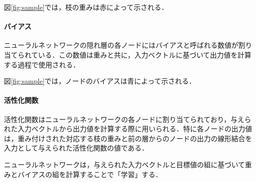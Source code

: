 \documentclass[11pt,dvipdfmx,twoside]{jarticle}
\newcommand{\figref}[1]{図\ref{fig:#1}}
\begin{document}
\figref{sample}では，枝の重みは赤によって示される．


\paragraph{バイアス}
ニューラルネットワークの隠れ層の各ノードにはバイアスと呼ばれる数値が割り当てられている．この数値は重みと共に，入力ベクトルに基づいて出力値を計算する過程で使用される．

\figref{sample}では，ノードのバイアスは青によって示される．

\paragraph{活性化関数}
活性化関数はニューラルネットワークの各ノードに割り当てられており，与えられた入力ベクトルから出力値を計算する際に用いられる．特に各ノードの出力値は，重み付けされた対応する枝の重みと前の層からのノードの出力の線形結合を入力として与えられた活性化関数の値である．

\medskip

ニューラルネットワークは，与えられた入力ベクトルと目標値の組に基づいて重みとバイアスの組を計算することで「学習」する．
\end{document}
